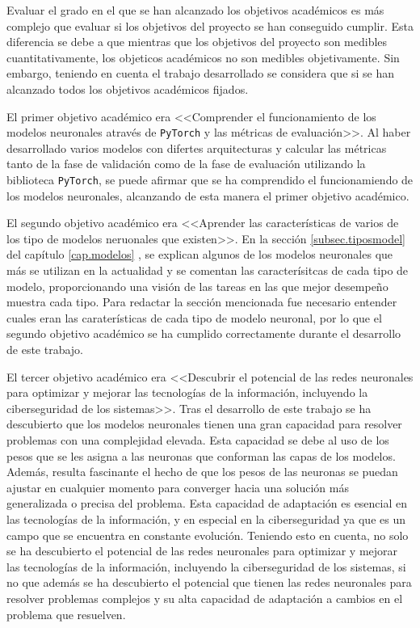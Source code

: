 Evaluar el grado en el que se han alcanzado los objetivos académicos es más complejo que evaluar si los objetivos del proyecto se han conseguido cumplir. Esta diferencia se debe a que mientras que los objetivos del proyecto son medibles cuantitativamente, los objeticos académicos no son medibles objetivamente. Sin embargo, teniendo en cuenta el trabajo desarrollado se considera que si se han alcanzado todos los objetivos académicos fijados.

El primer objetivo académico era <<Comprender el funcionamiento de los modelos neuronales através de \texttt{PyTorch} y las métricas de evaluación>>. Al haber desarrollado varios modelos con difertes arquitecturas y calcular las métricas tanto de la fase de validación como de la fase de evaluación utilizando la biblioteca \texttt{PyTorch}, se puede afirmar que se ha comprendido el funcionamiendo de los modelos neuronales, alcanzando de esta manera el primer objetivo académico.

El segundo objetivo académico era <<Aprender las características de varios de los tipo de modelos neruonales que existen>>. En la sección \ref{subsec.tiposmodel} del capítulo \ref{cap.modelos} , se explican algunos de los modelos neuronales que más se utilizan en la actualidad y se comentan las caracterísitcas de cada tipo de modelo, proporcionando una visión de las tareas en las que mejor desempeño muestra cada tipo. Para redactar la sección mencionada fue necesario entender cuales eran las caraterísticas de cada tipo de modelo neuronal, por lo que el segundo objetivo académico se ha cumplido correctamente durante el desarrollo de este trabajo.

El tercer objetivo académico era <<Descubrir el potencial de las redes neuronales para optimizar y mejorar las tecnologías de la información, incluyendo la ciberseguridad de los sistemas>>. Tras el desarrollo de este trabajo se ha descubierto que los modelos neuronales tienen una gran capacidad para resolver problemas con una complejidad elevada. Esta capacidad se debe al uso de los pesos que se les asigna a las neuronas que conforman las capas de los modelos. Además, resulta fascinante el hecho de que los pesos de las neuronas se puedan ajustar en cualquier momento para converger hacia una solución más generalizada o precisa del problema. Esta capacidad de adaptación es esencial en las tecnologías de la información, y en especial en la ciberseguridad ya que es un campo que se encuentra en constante evolución. Teniendo esto en cuenta, no solo se ha descubierto el potencial de las redes neuronales para optimizar y mejorar las tecnologías de la información, incluyendo la ciberseguridad de los sistemas, si no que además se ha descubierto el potencial que tienen las redes neuronales para resolver problemas complejos y su alta capacidad de adaptación a cambios en el problema que resuelven.


